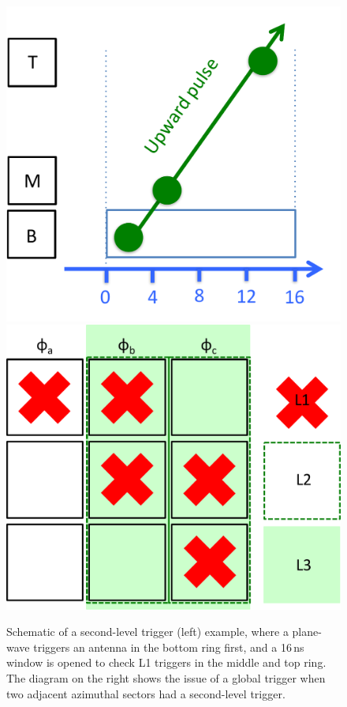 \begin{figure}[!h]\centering
  \includegraphics[width=.45\linewidth]{./Figs/ANITA3_l1trigger.pdf}
  \includegraphics[width=.45\linewidth]{./Figs/ANITA3_globalTrigger.pdf}
  \caption{Schematic of a second-level trigger (left) example, where a
  plane-wave triggers an antenna in the bottom ring first, and a
  16\,ns window is opened to check L1 triggers in the middle and top
  ring.
The diagram on the right shows the issue of a global trigger when two
adjacent azimuthal sectors had a second-level trigger.}
  \label{fig:ANITA_triggerLogic}
\end{figure}







